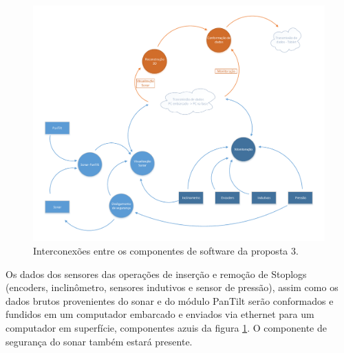 

\begin{figure}[H]
\centering
\includegraphics[width=\textwidth,height=\textheight,keepaspectratio]{figs/software/EstrutSoft/prop1_soft_3.pdf}
\caption{Interconexões entre os componentes de software da proposta 3.}
\label{fig:ES:3}
\end{figure}

Os dados dos sensores das operações de inserção e remoção de Stoplogs (encoders,
inclinômetro, sensores indutivos e sensor de pressão), assim como os dados
brutos provenientes do sonar e do módulo PanTilt serão conformados e fundidos em
um computador embarcado e enviados via ethernet para um computador em
superfície, componentes azuis da figura \ref{fig:ES:3}. O componente de
segurança do sonar também estará presente.



